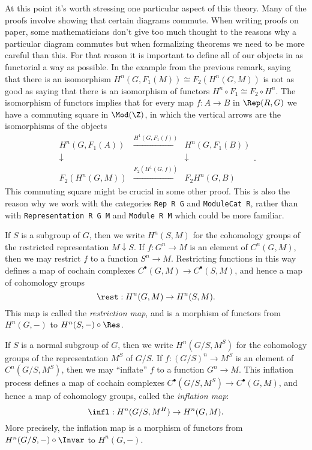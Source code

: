 \begin{remark}
	At this point it's worth stressing one particular aspect of this theory.
	Many of the proofs involve showing that certain diagrams commute. When writing proofs on paper,
	some mathematicians don't give too much thought to the reasons why a particular diagram commutes
	but when formalizing theorems we need to be more careful than this.
	For that reason it is important to define all of our objects in as functorial a way as possible.
	In the example from the previous remark,
	saying that there is an isomorphism $H^n(G,F_1(M)) \cong F_2(H^n(G,M))$
	is not as good as saying that there is an isomorphism of functors
	$H^n \circ F_1 \cong F_2 \circ H^n$.
	The isomorphism of functors implies that for every map $f : A \to B$ in $\Rep(R,G)$
	we have a commuting square in $\Mod(\Z)$, in which the vertical arrows are the isomorphisms
	of the objects
	\[
		\begin{matrix}
			H^n(G,F_1(A)) & \stackrel{H^1(G,F_1(f))}\to & H^n(G,F_1(B))\\
			\downarrow &&\downarrow \\
			F_2(H^n(G,M)) & \stackrel{F_2(H^1(G,f))}\to & F_2 H^n(G,B)
		\end{matrix} .
	\]
	This commuting square might be crucial in some other proof.
	This is also the reason why we work with the categories \texttt{Rep R G} and \texttt{ModuleCat R},
	rather than with \texttt{Representation R G M} and \texttt{Module R M} which could be more
	familiar.
\end{remark}

\begin{definition} \label{def:restriction map}
	\leanok
	If $S$ is a subgroup of $G$, then we write $H^n(S,M)$ for the
	cohomology groups of the restricted representation $M \downarrow S$.
	If $f : G^n \to M$ is an element of $C^n(G,M)$, then we may restrict $f$ to
	a function $S^n \to M$. Restricting functions in this way defines a map of
	cochain complexes $C^\bullet(G,M) \to C^\bullet(S,M)$, and hence a map of
	cohomology groups
	\[
		\rest : H^n(G,M) \to H^n(S,M).
	\]
	This map is called the \emph{restriction map}, and is a morphism of functors
	from $H^n(G,-)$ to $H^n(S, -) \circ \Res$.
\end{definition}

\begin{definition} \label{def:inflation map}
	\leanok
	If $S$ is a normal subgroup of $G$, then we write $H^n(G/S,M^S)$ for the
	cohomology groups of the representation $M^S$ of $G/S$.
	If $f : (G/S)^n \to M^S$ is an element of $C^n(G/S,M^S)$, then we may ``inflate'' $f$ to
	a function $G^n \to M$. This inflation process defines a map of
	cochain complexes $C^\bullet(G/S,M^S) \to C^\bullet(G,M)$, and hence a map of
	cohomology groups, called the \emph{inflation map}:
	\[
		\infl : H^n(G/S,M^H) \to H^n(G,M).
	\]
	More precisely, the inflation map is a morphism of functors from
	$H^n (G/S, -)\circ \Invar$ to $H^n(G,-)$.
\end{definition}


